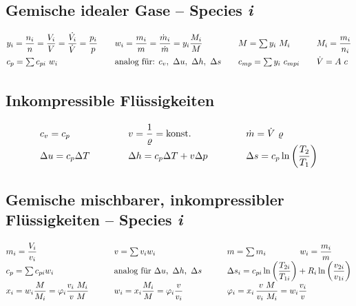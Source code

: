 \subsection{Gemische idealer Gase -- Species \textit{i}}
	\skipabove{-10pt}
		\[ \arraycolsep=0em  \def\arraystretch{1.5}
		\begin{array}{l p{2em} l p{2em} l p{2em} l}
			y_i = \dfrac{n_i}{n} = \dfrac{V_i}{V} = \dfrac{\dot{V_i}}{\dot{V}} = \dfrac{p_i}{p} && w_i  =  \dfrac{m_i}{m}  = \dfrac{\dot{m}_i}{\dot{m}} =  y_i \dfrac{M_i}{M} && M = \sum y_i\ M_i         & & M_i = \dfrac{m_i}{n_i} \\
			c_p = \sum c_{pi}\ w_i                                                              && \text{analog für: }  c_v,\ \Delta u,\ \Delta h,\ \Delta s                  && c_{mp} = \sum y_i\ c_{mpi}& & \dot{V} = A\ c
		\end{array} \]

\subsection{Inkompressible Flüssigkeiten}
	\skipabove{-15pt}
	\[ \arraycolsep=0em %
	\begin{array}{l p{4em} l p{4em} l}
		c_v = c_p               && v = \dfrac{1}{\varrho} = \text{konst.} && \dot{m} = \dot{V}\ \varrho                      \\
		\Delta u = c_p \Delta T && \Delta h = c_p \Delta T + v \Delta p   && \Delta s = c_p \ln\left(\dfrac{T_2}{T_1}\right)
	\end{array} \]

\subsection{Gemische mischbarer, inkompressibler Flüssigkeiten -- Species \textit{i}}
	\skipabove{-15pt}
		\[  \arraycolsep=0em  \def\arraystretch{1.7}
		\begin{array}{l p{3em} l p{3em} l}
			m_i = \dfrac{V_i}{v_i}                                      &  & v   = \sum v_i w_i                                  &  & m   = \sum m_i   \qquad\qquad   w_i = \dfrac{m_i}{m}                                                    \\
			c_p = \sum c_{pi} w_i                                       &  & \text{analog für }   \Delta u,\ \Delta h,\ \Delta s &  & \Delta s_i = c_{pi} \ln\left(\dfrac{T_{2i}}{T_{1i}}\right) + R_i \ln\left(\dfrac{v_{2i}}{v_{1i}}\right) \\
			x_i = w_i \dfrac{M}{M_i} = \varphi_i \dfrac{v_i\ M_i}{v\ M} &  & w_i = x_i \dfrac{M_i}{M} = \varphi_i \dfrac{v}{v_i} &  & \varphi_i = x_i \, \dfrac{v\ M}{v_i\ M_i} = w_i \dfrac{v_i}{v}
		\end{array} \]


